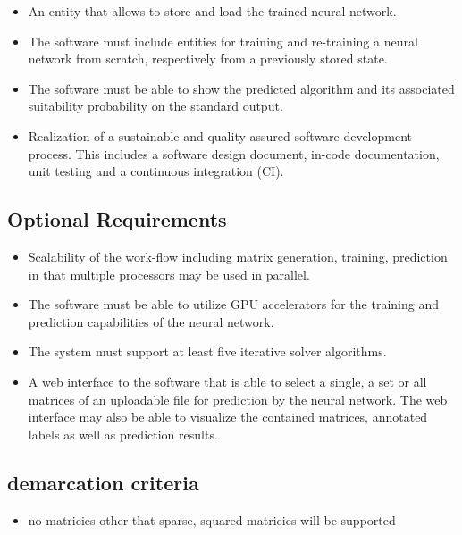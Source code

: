 \documentclass[parskip=full]{scrartcl}
\begin{document}
\begin{itemize}
\item An entity that allows to store and load the trained neural network.

\item The software must include entities for training and re-training a neural network from scratch, respectively from a previously stored state.

\item The software must be able to show the predicted algorithm and its associated suitability probability on the standard output.

\item Realization of a sustainable and quality-assured software development process. This includes a software design document, in-code documentation, unit testing and a continuous integration (CI).

\end{itemize}

\subsection{Optional Requirements}

\begin{itemize}
    
\item Scalability of the work-flow including matrix generation, training, prediction in that multiple processors may be used in parallel.

\item The software must be able to utilize GPU accelerators for the training and prediction capabilities of the neural network.

\item The system must support at least five iterative solver algorithms.

\item A web interface to the software that is able to select a single, a set or all matrices of an uploadable file for prediction by the neural network. The web interface may also be able to visualize the contained matrices, annotated labels as well as prediction results.

\end{itemize}

\subsection{demarcation criteria}
\begin{itemize}
\item no matricies other that sparse, squared matricies will be supported
\end{itemize}
\end{document}
